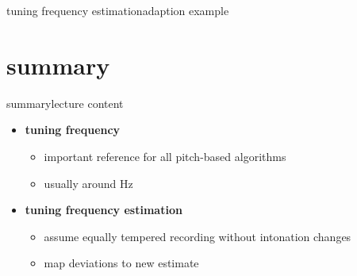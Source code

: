        \begin{frame}{tuning frequency estimation}{adaption example}
            \vspace{-3mm}
            
       \end{frame}
     

    \section{summary}
        \begin{frame}{summary}{lecture content}
            \begin{itemize}
                \item   \textbf{tuning frequency}
                    \begin{itemize}
                        \item   important reference for all pitch-based algorithms
                        \item   usually around \unit[440]{Hz}
                    \end{itemize}
                \bigskip
                \item  \textbf{tuning frequency estimation}
                    \begin{itemize}
                        \item   assume equally tempered recording without intonation changes
                        \item   map deviations to new estimate
                    \end{itemize}
            \end{itemize}
        \end{frame}

